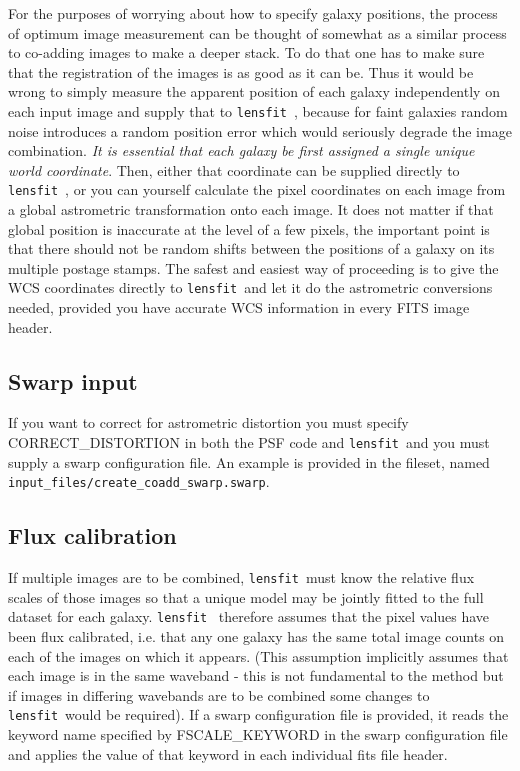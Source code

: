 \documentclass{article}
\def\lensfit{{\tt lensfit}\ }
\begin{document}
For the purposes of worrying about how to specify galaxy positions, 
the process of optimum image measurement can be thought of somewhat as a similar process to
co-adding images to make a deeper stack.  To do that one has to make sure that the
registration of the images is as good as it can be.  Thus it would be wrong to simply measure
the apparent position of each galaxy independently on each input image and supply that to
\lensfit, because for faint galaxies random noise introduces a random position error which
would seriously degrade the image combination.  
{\em It is essential that each galaxy be first assigned a single unique world coordinate}.
Then, either that coordinate can be supplied directly to \lensfit, or you can yourself
calculate the pixel coordinates on each image from a global astrometric transformation onto each image.  
It does not matter if that global position is inaccurate at the level of a few pixels,
the important point is that there should not be random shifts between the positions of a galaxy
on its multiple postage stamps.  The safest and easiest way of proceeding is to give the WCS coordinates
directly to \lensfit and let it do the astrometric conversions needed, provided you have accurate
WCS information in every FITS image header.

\subsection{Swarp input}
If you want to correct for astrometric distortion you must specify CORRECT\_DISTORTION in both the 
PSF code and \lensfit and you must supply a swarp configuration file.   An example is provided in
the fileset, named {\tt input\_files/create\_coadd\_swarp.swarp}.

\subsection{Flux calibration}
If multiple images are to be combined, \lensfit must know the relative flux scales of those images
so that a unique model may be jointly fitted to the full dataset for each galaxy.  \lensfit
therefore assumes that the pixel values have been flux calibrated, i.e. that any one galaxy has
the same total image counts on each of the images on which it appears.  (This assumption implicitly
assumes that each image is in the same waveband - this is not fundamental to the method but
if images in differing wavebands are to be combined some changes to \lensfit would be required).
If a swarp configuration file is provided, it reads the keyword name specified 
by FSCALE\_KEYWORD in the swarp 
configuration file and applies the value of that keyword in each individual fits file header. 
\end{document}
